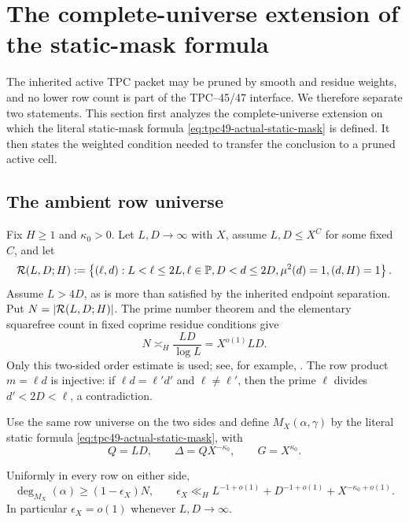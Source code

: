 \section{The complete-universe extension of the static-mask formula}
\label{sec:tpc49-static-mask}

The inherited active TPC packet may be pruned by smooth and residue
weights, and no lower row count is part of the TPC--45/47 interface.
We therefore separate two statements.  This section first analyzes the
complete-universe extension on which the literal static-mask formula
\eqref{eq:tpc49-actual-static-mask} is defined.  It then states the
weighted condition needed to transfer the conclusion to a pruned active
cell.

\subsection{The ambient row universe}

Fix \(H\ge1\) and \(\kappa_0>0\).  Let \(L,D\to\infty\) with \(X\),
assume \(L,D\le X^C\) for some fixed \(C\), and let
\begin{equation}
 \mathcal R(L,D;H)
 :=\left\{(\ell,d):
 L<\ell\le2L, \ell\in\mathbb P,
 D<d\le2D, \mu^2(d)=1, (d,H)=1
 \right\}.
 \label{eq:tpc49-complete-row-universe}
\end{equation}
Assume \(L>4D\), as is more than satisfied by the inherited endpoint
separation.  Put \(N=|\mathcal R(L,D;H)|\).  The prime number theorem and the
elementary squarefree count in fixed coprime residue conditions give
\begin{equation}
 N\asymp_H\frac{LD}{\log L}=X^{o(1)}LD.
 \label{eq:tpc49-complete-row-count}
\end{equation}
Only this two-sided order estimate is used; see, for example,
\citep[Chapter~1]{IwaniecKowalski2004}.  The row product
\(m=\ell d\) is injective: if \(\ell d=\ell'd'\) and
\(\ell\ne\ell'\), then the prime \(\ell\) divides
\(d'<2D<\ell\), a contradiction.

Use the same row universe on the two sides and define
\(M_X(\alpha,\gamma)\) by the literal static formula
\eqref{eq:tpc49-actual-static-mask}, with
\begin{equation}
 Q=LD,
 \qquad \Delta=QX^{-\kappa_0},
 \qquad G=X^{\kappa_0}.
 \label{eq:tpc49-complete-mask-scales}
\end{equation}

\begin{theorem}
\label{thm:tpc49-static-degree}
Uniformly in every row on either side,
\begin{equation}
 \deg_{M_X}(\alpha)
 \ge(1-\epsilon_X)N,
 \qquad
 \epsilon_X
 \ll_H
 L^{-1+o(1)}+D^{-1+o(1)}+X^{-\kappa_0+o(1)}.
 \label{eq:tpc49-static-min-degree}
\end{equation}
In particular \(\epsilon_X=o(1)\) whenever \(L,D\to\infty\).
\end{theorem}

